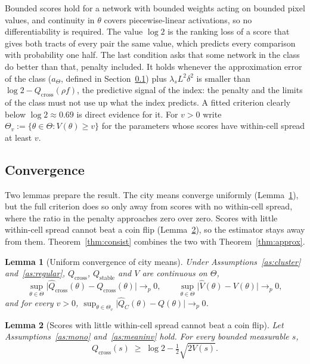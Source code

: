 \documentclass[11pt]{article}
\newtheorem{lemma}{Lemma}
\theoremstyle{remark}
\newcommand{\Qc}{Q_{\mathrm{cross}}}
\newcommand{\Qs}{Q_{\mathrm{stable}}}
\newcommand{\Qt}{Q}
\newcommand{\Qch}{\hat{Q}_{\mathrm{cross}}}
\newcommand{\Qth}{\hat{Q}}
\begin{document}
Bounded scores hold for a network with bounded weights acting on bounded pixel values, and continuity
in $\theta$ covers piecewise-linear activations, so no differentiability is required. The value
$\log 2$ is the ranking loss of a score that gives both tracts of every pair the same value, which
predicts every comparison with probability one half. The last condition asks that some network in the
class do better than that, penalty included. It holds whenever the approximation error of the class
($a_\Theta$, defined in Section~\ref{sec:conv}) plus $\lambda_{s}L^{2}\delta^{2}$ is smaller than
$\log 2 - \Qc(\rho f)$, the predictive signal of the index: the penalty and the limits of the class must
not use up what the index predicts. A fitted criterion clearly below $\log 2 \approx 0.69$ is direct
evidence for it. For $v>0$ write $\Theta_v := \{\theta\in\Theta : V(\theta) \ge v\}$ for the
parameters whose scores have within-cell spread at least $v$.

\subsection{Convergence}\label{sec:conv}

Two lemmas prepare the result. The city means converge uniformly (Lemma~\ref{lem:ulln}), but the full
criterion does so only away from scores with no within-cell spread, where the ratio in the penalty
approaches zero over zero. Scores with little within-cell spread cannot beat a coin flip
(Lemma~\ref{lem:coinflip}), so the estimator stays away from them. Theorem~\ref{thm:consist} combines
the two with Theorem~\ref{thm:approx}.

\begin{lemma}[Uniform convergence of city means]\label{lem:ulln}
Under Assumptions~\ref{as:cluster} and~\ref{as:regular}, $\Qc$, $\Qs$ and $V$ are continuous on
$\Theta$,
\[
    \sup_{\theta\in\Theta}\bigl|\Qch(\theta) - \Qc(\theta)\bigr| \to_p 0,
    \qquad
    \sup_{\theta\in\Theta}\bigl|\hat{V}(\theta) - V(\theta)\bigr| \to_p 0,
\]
and for every $v>0$, $\sup_{\theta\in\Theta_v}\bigl|\Qth_C(\theta) - \Qt(\theta)\bigr| \to_p 0$.
\end{lemma}

\begin{lemma}[Scores with little within-cell spread cannot beat a coin flip]\label{lem:coinflip}
Let Assumptions~\ref{as:mono} and~\ref{as:meaninv} hold. For every bounded measurable $s$,
\[
    \Qc(s) \;\ge\; \log 2 - \tfrac12\sqrt{2V(s)} .
\]
\end{lemma}
\end{document}
